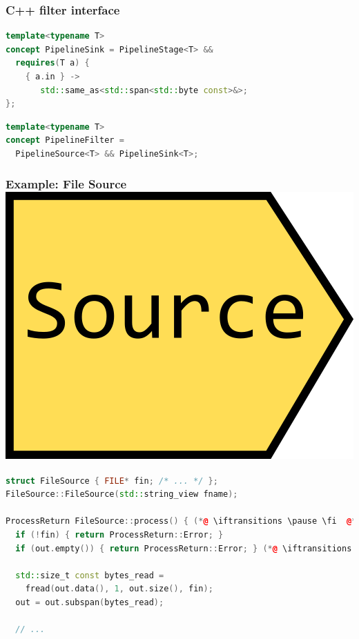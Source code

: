 \documentclass[aspectratio=169]{beamer}
\newif\iftransitions
\begin{document}
\begin{frame}[fragile]
  \frametitle{C++ filter interface}

  \begin{lstlisting}[language={C++}]
template<typename T>
concept PipelineSink = PipelineStage<T> &&
  requires(T a) {
    { a.in } ->
       std::same_as<std::span<std::byte const>&>;
};
  \end{lstlisting}
  \iftransitions \pause \fi
  \begin{lstlisting}[language={C++}]
template<typename T>
concept PipelineFilter =
  PipelineSource<T> && PipelineSink<T>;
  \end{lstlisting}
\end{frame}

\iftransitions
\fi

\begin{frame}[fragile]
  \frametitle{Example: File Source \hspace{250pt} \includegraphics[height=.1\textheight]{pipelinesgfx/source.png}}
  \begin{lstlisting}[language={C++}]
struct FileSource { FILE* fin; /* ... */ };
FileSource::FileSource(std::string_view fname);

ProcessReturn FileSource::process() { (*@ \iftransitions \pause \fi  @*)
  if (!fin) { return ProcessReturn::Error; }
  if (out.empty()) { return ProcessReturn::Error; } (*@ \iftransitions \pause \fi @*)
  
  std::size_t const bytes_read =
    fread(out.data(), 1, out.size(), fin);
  out = out.subspan(bytes_read);
  
  // ...
  \end{lstlisting}
\end{frame}
\end{document}
